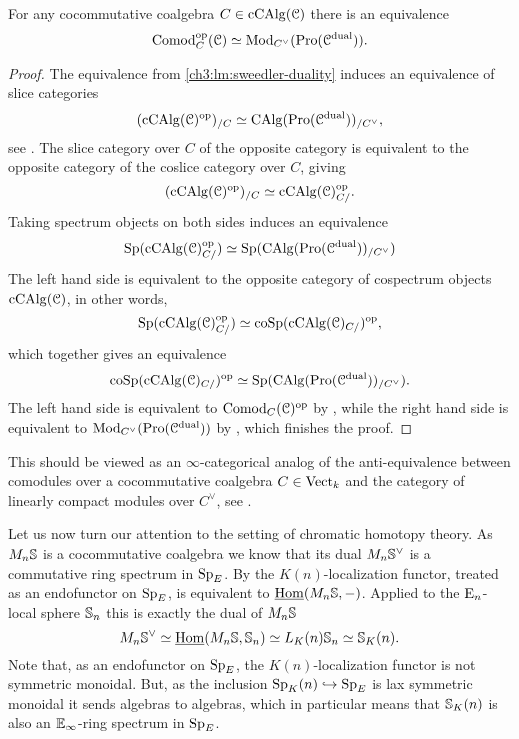 \begin{proposition}
    \label{ch3:prop:comodules-and-promodules}
    For any cocommutative coalgebra $C\in \cCAlg(\C)$ there is an equivalence 
    \[\Comod\op_C(\C)\simeq \Mod_{C^\vee}(\Pro(\C\dual)).\]  
\end{proposition}
\begin{proof}
    The equivalence from \cref{ch3:lm:sweedler-duality} induces an equivalence of slice categories 
    \[(\cCAlg(\C)\op)_{/C}\simeq \CAlg(\Pro(\C\dual))_{/C^\vee},\]
    see \cite[5.2.5.1]{lurie_09}. The slice category over $C$ of the opposite category is equivalent to the opposite category of the coslice category over $C$, giving 
    \[(\cCAlg(\C)\op)_{/C} \simeq \cCAlg(\C)\op_{C/}.\]
    Taking spectrum objects on both sides induces an equivalence
    \[\Sp(\cCAlg(\C)_{C/}\op)\simeq \Sp(\CAlg(\Pro(\C\dual))_{/C^\vee})\]
    The left hand side is equivalent to the opposite category of cospectrum objects $\cCAlg(\C)$, in other words, 
    \[\Sp(\cCAlg(\C)_{C/}\op)\simeq \coSp(\cCAlg(\C)_{C/})\op,\]
    which together gives an equivalence
    \[\coSp(\cCAlg(\C)_{C/})\op \simeq \Sp(\CAlg(\Pro(\C\dual))_{/C^\vee}).\]
    The left hand side is equivalent to $\Comod_C(\C)\op$ by \cite[1.0.3]{chen_2024}, while the right hand side is equivalent to $\Mod_{C^\vee}(\Pro(\C\dual))$ by \cite[7.3.4.13]{Lurie_HA}, which finishes the proof.  
\end{proof}

\begin{remark}
    This should be viewed as an $\infty$-categorical analog of the anti-equivalence between comodules over a cocommutative coalgebra $C\in \Vect_k$ and the category of linearly compact modules over $C^\vee$, see \cite[II.29]{lefschetz_1942}. 
\end{remark}

Let us now turn our attention to the setting of chromatic homotopy theory. As $M_n\S$ is a cocommutative coalgebra we know that its dual $M_n\S^\vee$ is a commutative ring spectrum in $\SpE$. By \cite[2.21(4)]{barthel-heard-valenzuela_2018} the $K(n)$-localization functor, treated as an endofunctor on $\SpE$, is equivalent to $\iHom(M_n\S,-)$. Applied to the $\En$-local sphere $\S_n$ this is exactly the dual of $M_n\S$
\[M_n \S^\vee \simeq \iHom(M_n\S, \S_n)\simeq L_\Kn \S_n \simeq \S_\Kn.\]
Note that, as an endofunctor on $\SpE$, the $K(n)$-localization functor is not symmetric monoidal. But, as the inclusion $\Sp_\Kn\hookrightarrow \SpE$ is lax symmetric monoidal it sends algebras to algebras, which in particular means that $\S_\Kn$ is also an $\E_\infty$-ring spectrum in $\SpE$. 

